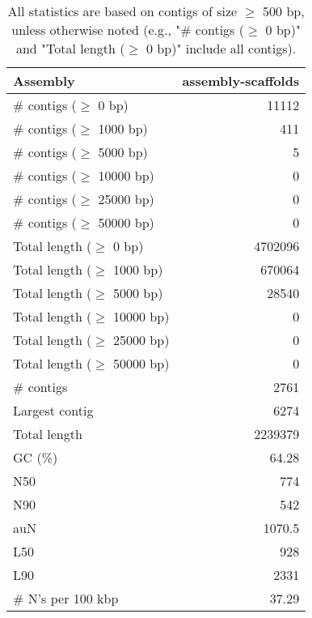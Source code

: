 \documentclass[12pt,a4paper]{article}
\begin{document}
\begin{table}[ht]
\begin{center}
\caption{All statistics are based on contigs of size $\geq$ 500 bp, unless otherwise noted (e.g., "\# contigs ($\geq$ 0 bp)" and "Total length ($\geq$ 0 bp)" include all contigs).}
\begin{tabular}{|l*{1}{|r}|}
\hline
Assembly & assembly-scaffolds \\ \hline
\# contigs ($\geq$ 0 bp) & 11112 \\ \hline
\# contigs ($\geq$ 1000 bp) & 411 \\ \hline
\# contigs ($\geq$ 5000 bp) & 5 \\ \hline
\# contigs ($\geq$ 10000 bp) & 0 \\ \hline
\# contigs ($\geq$ 25000 bp) & 0 \\ \hline
\# contigs ($\geq$ 50000 bp) & 0 \\ \hline
Total length ($\geq$ 0 bp) & 4702096 \\ \hline
Total length ($\geq$ 1000 bp) & 670064 \\ \hline
Total length ($\geq$ 5000 bp) & 28540 \\ \hline
Total length ($\geq$ 10000 bp) & 0 \\ \hline
Total length ($\geq$ 25000 bp) & 0 \\ \hline
Total length ($\geq$ 50000 bp) & 0 \\ \hline
\# contigs & 2761 \\ \hline
Largest contig & 6274 \\ \hline
Total length & 2239379 \\ \hline
GC (\%) & 64.28 \\ \hline
N50 & 774 \\ \hline
N90 & 542 \\ \hline
auN & 1070.5 \\ \hline
L50 & 928 \\ \hline
L90 & 2331 \\ \hline
\# N's per 100 kbp & 37.29 \\ \hline
\end{tabular}
\end{center}
\end{table}
\end{document}
